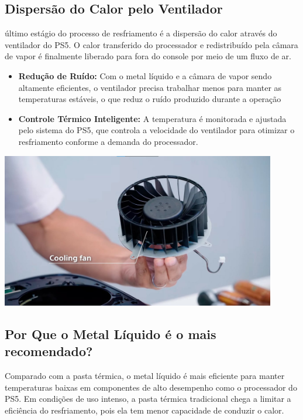 \documentclass{article}
\begin{document}
\subsection{Dispersão do Calor pelo Ventilador}
último estágio do processo de resfriamento é a dispersão do calor através do ventilador do PS5. O calor transferido do processador e redistribuído pela câmara de vapor é finalmente liberado para fora do console por meio de um fluxo de ar.
\begin{itemize}
    \item \textbf{Redução de Ruído: } Com o metal líquido e a câmara de vapor sendo altamente eficientes, o ventilador precisa trabalhar menos para manter as temperaturas estáveis, o que reduz o ruído produzido durante a operação
    \item \textbf{Controle Térmico Inteligente:}  A temperatura é monitorada e ajustada pelo sistema do PS5, que controla a velocidade do ventilador para otimizar o resfriamento conforme a demanda do processador.
\end{itemize}
\begin{adjustbox}{center,caption={Fan utilizada no playstation 5 (Imagem: PlayStation/Reprodução)},nofloat=figure,vspace=\bigskipamount}
    \centering
    \includegraphics[width=12cm]{ventoinha.png}
\end{adjustbox}
\subsection{ Por Que o Metal Líquido é o mais recomendado?}
Comparado com a pasta térmica, o metal líquido é mais eficiente para manter temperaturas baixas em componentes de alto desempenho como o processador do PS5. Em condições de uso intenso, a pasta térmica tradicional chega a limitar a eficiência do resfriamento, pois ela tem menor capacidade de conduzir o calor.
\end{document}

